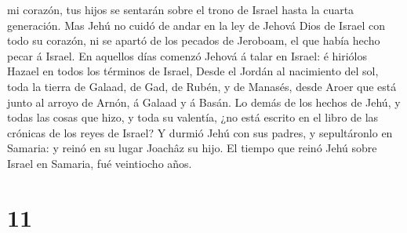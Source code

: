 mi corazón, tus hijos se sentarán sobre el trono de Israel hasta la
cuarta generación.  Mas Jehú no cuidó de andar en la ley de
Jehová Dios de Israel con todo su corazón, ni se apartó de los pecados
de Jeroboam, el que había hecho pecar á Israel.  En
aquellos días comenzó Jehová á talar en Israel: é hiriólos Hazael en
todos los términos de Israel,  Desde el Jordán al
nacimiento del sol, toda la tierra de Galaad, de Gad, de Rubén, y de
Manasés, desde Aroer que está junto al arroyo de Arnón, á Galaad y á
Basán.  Lo demás de los hechos de Jehú, y todas las cosas
que hizo, y toda su valentía, ¿no está escrito en el libro de las
crónicas de los reyes de Israel?  Y durmió Jehú con sus
padres, y sepultáronlo en Samaria: y reinó en su lugar Joachâz su hijo.
 El tiempo que reinó Jehú sobre Israel en Samaria, fué
veintiocho años.

\hypertarget{section-10}{%
\section{11}\label{section-10}}

